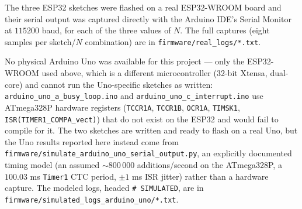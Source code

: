 The three ESP32 sketches were flashed on a real ESP32-WROOM board and their serial output was captured directly with the Arduino IDE's Serial Monitor at $115200$ baud, for each of the three values of $N$. The full captures (eight samples per sketch/$N$ combination) are in \texttt{firmware/real\_logs/*.txt}.

No physical Arduino Uno was available for this project — only the ESP32-WROOM used above, which is a different microcontroller (32-bit Xtensa, dual-core) and cannot run the Uno-specific sketches as written: \texttt{arduino\_uno\_a\_busy\_loop.ino} and \texttt{arduino\_uno\_c\_interrupt.ino} use ATmega328P hardware registers (\texttt{TCCR1A}, \texttt{TCCR1B}, \texttt{OCR1A}, \texttt{TIMSK1}, \texttt{ISR(TIMER1\_COMPA\_vect)}) that do not exist on the ESP32 and would fail to compile for it. The two sketches are written and ready to flash on a real Uno, but the Uno results reported here instead come from \texttt{firmware/simulate\_arduino\_uno\_serial\_output.py}, an explicitly documented timing model (an assumed $\sim\!800\,000$ additions/second on the ATmega328P, a $100.03$ ms \texttt{Timer1} CTC period, $\pm 1$ ms ISR jitter) rather than a hardware capture. The modeled logs, headed \texttt{\# SIMULATED}, are in \texttt{firmware/simulated\_logs\_arduino\_uno/*.txt}.
